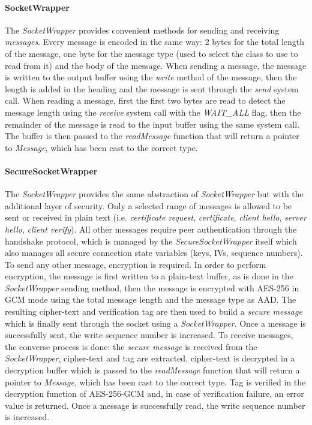 \paragraph{SocketWrapper}
The \emph{SocketWrapper} provides convenient methods for sending and receiving
\emph{messages}. Every message is encoded in the same way: 2 bytes for the 
total length of the message, one byte for the message type (used to select 
the class to use to read from it) and the body of the message. 
When sending a message, the message is written to the output buffer using the
\emph{write} method of the message, then the length is added in the heading 
and the message is sent through the \emph{send} system call. 
When reading a message, first the first two bytes are read to detect the 
message length using the \emph{receive} system call with the \emph{WAIT\_ALL}
flag, then the remainder of the message is read to the input buffer using the
same system call. The buffer is then passed to the \emph{readMessage} function
that will return a pointer to \emph{Message}, which has been cast to the 
correct type. 

\paragraph{SecureSocketWrapper}
The \emph{SocketWrapper} provides the same abstraction of \emph{SocketWrapper}
but with the additional layer of security. Only a selected range of messages
is allowed to be sent or received in plain text (i.e. \emph{certificate 
request}, \emph{certificate}, \emph{client hello}, \emph{server hello},
\emph{client verify}). All other messages require peer authentication through 
the handshake protocol, which is managed by the \emph{SecureSocketWrapper}
itself which also manages all secure connection state variables (keys, IVs, 
sequence numbers).
To send any other message, encryption is required. In order to perform 
encryption, the message is first written to a
plain-text buffer, as is done in the \emph{SocketWrapper} sending method, 
then the message is encrypted with AES-256 in GCM mode using the total message
length and the message type as AAD. The resulting cipher-text and verification
tag are then used to build a \emph{secure message} which is finally sent through
the socket using a \emph{SocketWrapper}. Once a message is successfully sent, 
the write sequence number is increased.
To receive messages, the converse process is done: the \emph{secure message}
is received from the \emph{SocketWrapper}, cipher-text and tag are extracted,
cipher-text is decrypted in a decryption buffer which is passed to the 
\emph{readMessage} function that will return a pointer to \emph{Message}, which 
has been cast to the correct type. Tag is verified in the decryption function
of AES-256-GCM and, in case of verification failure, an error value is returned.
Once a message is successfully read, the write sequence number is increased.
